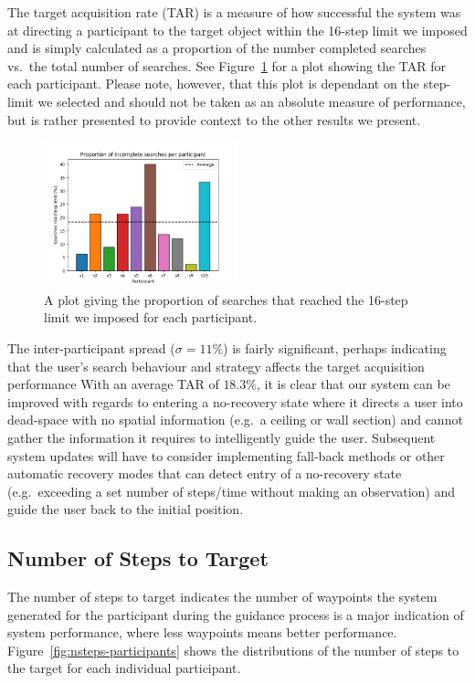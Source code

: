 \documentclass[a4paper, twoside]{article}
\begin{document}
\noindent The target acquisition rate (TAR) is a measure of how successful the system was at directing a participant to the target object within the 16-step limit we imposed and is simply calculated as a proportion of the number completed searches vs.\ the total number of searches. See Figure~\ref{fig:incomplete-searches-subjects} for a plot showing the TAR for each participant. Please note, however, that this plot is dependant on the step-limit we selected and should not be taken as an absolute measure of performance, but is rather presented to provide context to the other results we present. 

\begin{figure}
  \centering
  \includegraphics[width=0.5\textwidth]{figures/incomplete_searches_subjects.png}
  \caption{A plot giving the proportion of searches that reached the 16-step limit we imposed for each participant. }\label{fig:incomplete-searches-subjects}
\end{figure}

The inter-participant spread ($\sigma=11\%$) is fairly significant, perhaps indicating that the user's search behaviour and strategy affects the target acquisition performance  With an average TAR of $18.3\%$, it is clear that our system can be improved with regards to entering a no-recovery state where it directs a user into dead-space with no spatial information (e.g.\ a ceiling or wall section) and cannot gather the information it requires to intelligently guide the user. Subsequent system updates will have to consider implementing fall-back methods or other automatic recovery modes that can detect entry of a no-recovery state (e.g.\ exceeding a set number of steps/time without making an observation) and guide the user back to the initial position.

\subsection{Number of Steps to Target}

\noindent The number of steps to target indicates the number of waypoints the system generated for the participant during the guidance process is a major indication of system performance, where less waypoints means better performance. Figure~\ref{fig:nsteps-participants} shows the distributions of the number of steps to the target for each individual participant. 
\end{document}
